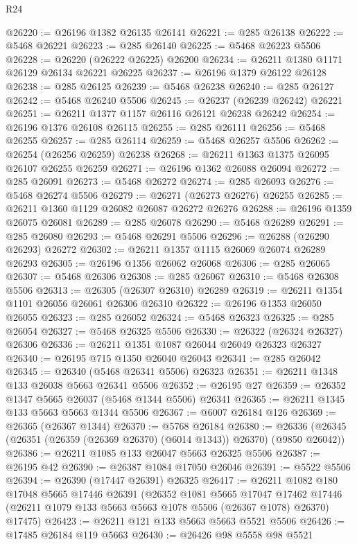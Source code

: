 \begin{lexlean}{R24}
\begin{coremodule}
@26220 := @26196 @1382 @26135 @26141
@26221 := @285 @26138
@26222 := @5468 @26221
@26223 := @285 @26140
@26225 := @5468 @26223 @5506
@26228 := @26220 (@26222 @26225) @26200
@26234 := @26211 @1380 @1171 @26129 @26134 @26221 @26225
@26237 := @26196 @1379 @26122 @26128
@26238 := @285 @26125
@26239 := @5468 @26238
@26240 := @285 @26127
@26242 := @5468 @26240 @5506
@26245 := @26237 (@26239 @26242) @26221
@26251 := @26211 @1377 @1157 @26116 @26121 @26238 @26242
@26254 := @26196 @1376 @26108 @26115
@26255 := @285 @26111
@26256 := @5468 @26255
@26257 := @285 @26114
@26259 := @5468 @26257 @5506
@26262 := @26254 (@26256 @26259) @26238
@26268 := @26211 @1363 @1375 @26095 @26107 @26255 @26259
@26271 := @26196 @1362 @26088 @26094
@26272 := @285 @26091
@26273 := @5468 @26272
@26274 := @285 @26093
@26276 := @5468 @26274 @5506
@26279 := @26271 (@26273 @26276) @26255
@26285 := @26211 @1360 @1129 @26082 @26087 @26272 @26276
@26288 := @26196 @1359 @26075 @26081
@26289 := @285 @26078
@26290 := @5468 @26289
@26291 := @285 @26080
@26293 := @5468 @26291 @5506
@26296 := @26288 (@26290 @26293) @26272
@26302 := @26211 @1357 @1115 @26069 @26074 @26289 @26293
@26305 := @26196 @1356 @26062 @26068
@26306 := @285 @26065
@26307 := @5468 @26306
@26308 := @285 @26067
@26310 := @5468 @26308 @5506
@26313 := @26305 (@26307 @26310) @26289
@26319 := @26211 @1354 @1101 @26056 @26061 @26306 @26310
@26322 := @26196 @1353 @26050 @26055
@26323 := @285 @26052
@26324 := @5468 @26323
@26325 := @285 @26054
@26327 := @5468 @26325 @5506
@26330 := @26322 (@26324 @26327) @26306
@26336 := @26211 @1351 @1087 @26044 @26049 @26323 @26327
@26340 := @26195 @715 @1350 @26040 @26043
@26341 := @285 @26042
@26345 := @26340 (@5468 @26341 @5506) @26323
@26351 := @26211 @1348 @133 @26038 @5663 @26341 @5506
@26352 := @26195 @27
@26359 := @26352 @1347 @5665 @26037 (@5468 @1344 @5506) @26341
@26365 := @26211 @1345 @133 @5663 @5663 @1344 @5506
@26367 := @6007 @26184 @126
@26369 := @26365 (@26367 @1344)
@26370 := @5768 @26184
@26380 := @26336 (@26345 (@26351 (@26359 (@26369 @26370) (@6014 @1343)) @26370) (@9850 @26042))
@26386 := @26211 @1085 @133 @26047 @5663 @26325 @5506
@26387 := @26195 @42
@26390 := @26387 @1084 @17050 @26046
@26391 := @5522 @5506
@26394 := @26390 (@17447 @26391) @26325
@26417 := @26211
    @1082
    @180
    @17048
    @5665
    @17446
    @26391
    (@26352
      @1081
      @5665
      @17047
      @17462
      @17446
      (@26211 @1079 @133 @5663 @5663 @1078 @5506 (@26367 @1078) @26370)
      @17475)
@26423 := @26211 @121 @133 @5663 @5663 @5521 @5506
@26426 := @17485 @26184 @119 @5663
@26430 := @26426 @98 @5558 @98 @5521

\end{coremodule}
\end{lexlean}

